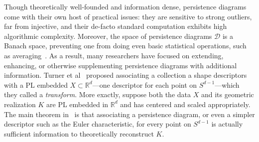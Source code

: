 
Though theoretically well-founded and information dense, persistence diagrams come with their own host of practical issues: they are sensitive to strong outliers, far from injective, and their de-facto standard computation exhibits high algorithmic complexity. 
Moreover, the space of persistence diagrams $\mathcal{D}$ is a Banach space, preventing one from doing even basic statistical operations, such as averaging~\cite{}. 
As a result, many researchers have focused on extending, enhancing, or otherwise supplementing persistence diagrams with additional information. 
Turner et al~\cite{} proposed associating a collection a shape descriptors with a PL embedded $X \subset \mathbb{R}^d$---one descriptor for each point on $S^{d-1}$---which they called a \emph{transform}. 
More exactly, suppose both the data $X$ and its geometric realization $K$ are PL embedded in $\mathbb{R}^d$ and has centered and scaled appropriately.
The main theorem in~\cite{} is that associating a persistence diagram, or even a simpler descriptor such as the Euler characteristic, for every point on $S^{d-1}$ is actually sufficient information to theoretically reconstruct $K$. 


